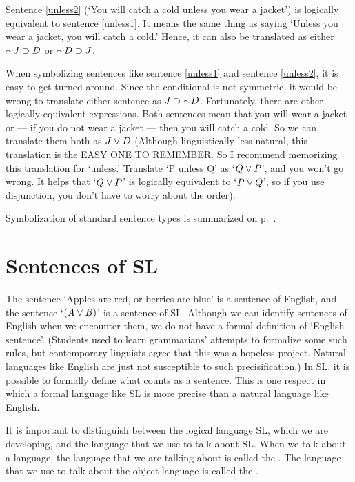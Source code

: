 Sentence \ref{unless2} (`You will catch a cold unless you wear a jacket') is logically equivalent to sentence \ref{unless1}. It means the same thing as saying `Unless you wear a jacket, you will catch a cold.' Hence, it can also be translated as either $\enot J \eif D$ or $\enot D \eif J$.

When symbolizing sentences like sentence \ref{unless1} and sentence \ref{unless2}, it is easy to get turned around. Since the conditional is not symmetric, it would be wrong to translate either sentence as $J \eif \enot D$. Fortunately, there are other logically equivalent expressions. Both sentences mean that you will wear a jacket or --- if you do not wear a jacket --- then you will catch a cold. So we can translate them both as $J \vee D$ {\color{black}(Although linguistically less natural, this translation is the EASY ONE TO REMEMBER. So I recommend memorizing this translation for `unless.' Translate `P unless Q' as `$Q \vee P$', and you won't go wrong. It helps that  `$Q \vee P$' is logically equivalent to `$P \vee Q$', so if you use disjunction, you don't have to worry about the order)}.



Symbolization of standard sentence types is summarized on p.~\pageref{app.notation}.





\section{Sentences of SL}
\label{sec:sentencesofSL}
The sentence `Apples are red, or berries are blue' is a sentence of English, and the sentence `$(A\vee B)$' is a sentence of SL. Although we can identify sentences of English when we encounter them, we do not have a formal definition of `English sentence'. (Students used to learn grammarians' attempts to formalize some such rules, but contemporary linguists agree that this was a hopeless project. Natural languages like English are just not susceptible to such precisification.) In SL, it is possible to formally define what counts as a sentence. This is one respect in which a formal language like SL is more precise than a natural language like English.

It is important to distinguish between the logical language SL, which we are developing, and the language that we use to talk about SL. When we talk about a language, the language that we are talking about is called the . The language that we use to talk about the object language is called the .
\label{def.metalanguage}

